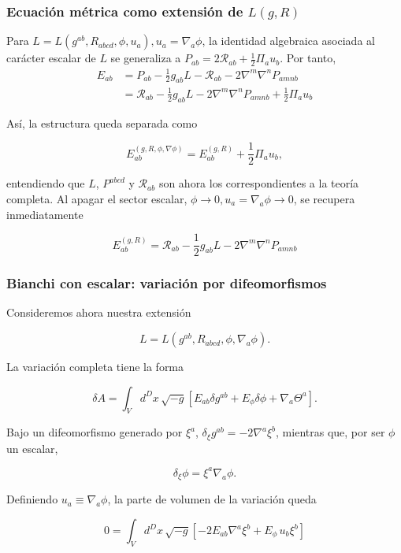 \documentclass{beamer}
\newcommand{\Rcal}{\mathcal{R}}
\begin{document}
\begin{frame}[label=nav-frame-078]
	\frametitle{Ecuación métrica como extensión de $L(g,R)$}
	\small

	Para $L=L(g^{ab},R_{abcd},\phi,u_a), u_a=\nabla_a\phi$, la identidad algebraica asociada al carácter escalar de $L$ se generaliza a $P_{ab}=2\Rcal_{ab}+ \frac12 \Pi_{a}u_{b}$. Por tanto,
	\begin{align*}
		E_{ab}
		&=
		P_{ab}
		-\frac12g_{ab}L
		-\Rcal_{ab}
		-2\nabla^m\nabla^nP_{amnb}
		\\
		&=
		\boxed{
			\Rcal_{ab}
			-\frac12g_{ab}L
			-2\nabla^m\nabla^nP_{amnb}
			+
			\frac12\Pi_{a}u_{b}
		}
	\end{align*}

	Así, la estructura queda separada como

	\[
	\boxed{
		E_{ab}^{(g,R,\phi,\nabla\phi)}
		=
		E_{ab}^{(g,R)}
		+
		\frac12\Pi_{a}u_{b}
	},
	\]

	entendiendo que $L$, $P^{abcd}$ y $\Rcal_{ab}$ son ahora
	los correspondientes a la teoría completa. Al apagar el sector escalar, $\phi\to0, u_a=\nabla_a\phi\to0$, se recupera inmediatamente

	\[
		E_{ab}^{(g,R)}
		=
		\Rcal_{ab}
		-\frac12g_{ab}L
		-2\nabla^m\nabla^nP_{amnb}
	\]

\end{frame}



\begin{frame}[label=nav-frame-080]
	\frametitle{Bianchi con escalar: variación por difeomorfismos}
	\small

	Consideremos ahora nuestra extensión

	\[
	L=L(g^{ab},R_{abcd},\phi,\nabla_a\phi).
	\]

	La variación completa tiene la forma

	\[
	\delta A
	=
	\int_V d^Dx\,\sqrt{-g}
	\left[
	E_{ab}\delta g^{ab}
	+
	E_\phi\delta\phi
	+
	\nabla_a\Theta^a
	\right].
	\]

	Bajo un difeomorfismo generado por $\xi^a$, $\delta_\xi g^{ab} = -2\nabla^{a}\xi^{b}$, mientras que, por ser $\phi$ un escalar,

	\[
	\delta_\xi\phi
	=
	\xi^a\nabla_a\phi.
	\]

	Definiendo $u_a\equiv\nabla_a\phi$, la parte de volumen de la variación queda

	\[
	0
	=
	\int_V d^Dx\,\sqrt{-g}
	\left[
	-2E_{ab}\nabla^a\xi^b
	+
	E_\phi\,u_b\xi^b
	\right]
	\]
	\end{frame}
\end{document}
